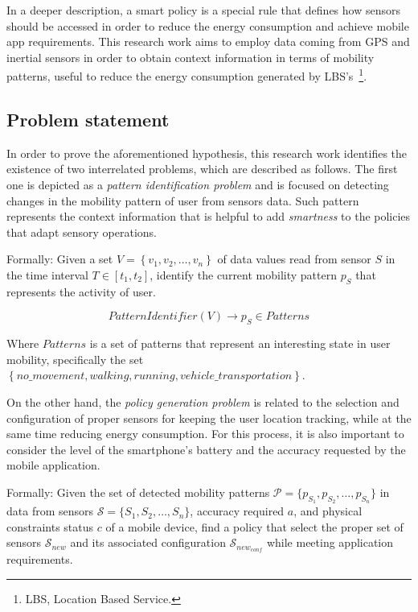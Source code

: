 \documentclass[ENG,PhD]{cinvestav}
\begin{document}
In a deeper description, a smart policy is a special rule that defines how sensors should be accessed in order to reduce the energy consumption and achieve mobile app requirements.
This research work aims to employ data coming from GPS and inertial sensors in order to obtain context information in terms of mobility patterns, useful to reduce the energy consumption generated by LBS's~\footnote{LBS, Location Based Service.}.


\subsection{Problem statement} 
\label{sub:problem_statement}
In order to prove the aforementioned hypothesis, this research work identifies the existence of two interrelated problems, which are described as follows.
The first one is depicted as a \emph{pattern identification problem} and is focused on detecting changes in the mobility pattern of user from sensors data.
Such pattern represents the context information that is helpful to add \emph{smartness} to the policies that adapt sensory operations.

Formally:
Given a set $V = \left\{v_{1}, v_{2}, \dotsc, v_{n}\right\}$ of data values read from sensor $S$ in the time interval $T  \in [t_{1}, t_{2}]$, identify the current mobility pattern $p_{S}$ that represents the activity of user.

\begin{equation}
  PatternIdentifier( V ) \longrightarrow{} p_{S} \in Patterns
\end{equation}

Where $Patterns$ is a set of patterns that represent an interesting state in user mobility, specifically the set $\left\{no\_movement, walking, running, vehicle\_transportation\right\}$.

On the other hand, the \emph{policy generation problem} is related to the selection and configuration of proper sensors for keeping the user location tracking, while at the same time reducing energy consumption.
For this process, it is also important to consider the level of the smartphone's battery and the accuracy requested by the mobile application.

Formally:
Given the set of detected mobility patterns $\mathcal{P} = \{ p_{S_1}, p_{S_2}, \ldots, p_{S_n} \}$ in data from sensors $\mathcal{S} = \{ S_1,S_2,\ldots, S_n \}$, accuracy required $a$, and physical constraints status $c$ of a mobile device, find a policy that select the proper set of sensors $\mathcal{S}_{new}$ and its associated configuration $\mathcal{S}_{new_{conf}}$  while meeting application requirements.
\end{document}
